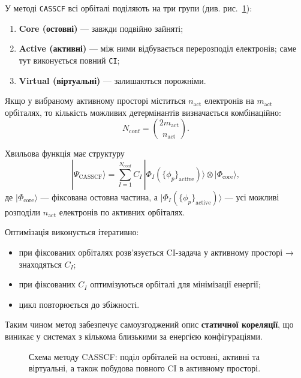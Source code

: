У методі \texttt{CASSCF} всі орбіталі поділяють на три групи
(див. рис.~\ref{fig:CASSCF_scheme}):
\begin{enumerate}
    \item \textbf{Core (остовні)} --- завжди подвійно зайняті;
    \item \textbf{Active (активні)} --- між ними відбувається перерозподіл
          електронів; саме тут виконується повний \texttt{CI};
    \item \textbf{Virtual (віртуальні)} --- залишаються порожніми.
\end{enumerate}

Якщо у вибраному активному просторі міститься $n_{\text{act}}$
електронів на $m_{\text{act}}$ орбіталях, то кількість можливих
детермінантів визначається комбінаційно:
\[
N_{\text{conf}} = \binom{2m_{\text{act}}}{n_{\text{act}}}.
\]

Хвильова функція має структуру
\[
    |\Psi_{\mathrm{CASSCF}}\rangle
    = \sum_{I=1}^{N_{\text{conf}}} C_I\,
      |\Phi_I(\{\phi_p\}_{\mathrm{active}})\rangle
      \otimes |\Phi_{\mathrm{core}}\rangle,
\]
де $|\Phi_{\mathrm{core}}\rangle$ — фіксована остовна частина, а
$|\Phi_I(\{\phi_p\}_{\mathrm{active}})\rangle$ — усі можливі розподіли
$n_{\text{act}}$ електронів по активних орбіталях.

Оптимізація виконується ітеративно:
\begin{itemize}
    \item при фіксованих орбіталях розв'язується CI-задача
          у активному просторі → знаходяться $C_I$;
    \item при фіксованих $C_I$ оптимізуються орбіталі
          для мінімізації енергії;
    \item цикл повторюється до збіжності.
\end{itemize}

Таким чином метод забезпечує самоузгоджений опис \textbf{статичної
кореляції}, що виникає у системах з кількома близькими за енергією
конфігураціями.

\begin{figure}[h!]\centering

\caption{Схема методу CASSCF: поділ орбіталей на остовні, активні та
віртуальні, а також побудова повного CI в активному просторі.}
\label{fig:CASSCF_scheme}
\end{figure}



